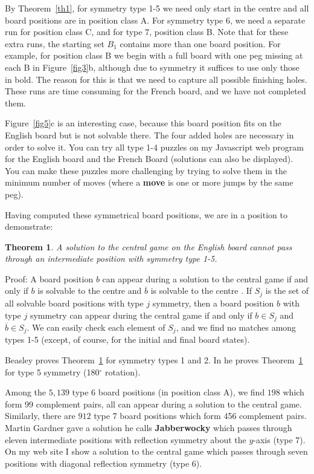 \documentclass[12pt,reqno]{article}
\newtheorem{theorem}{Theorem}
\begin{document}
By Theorem~\ref{th1}, for symmetry type 1-5 we need only start in the centre and all board positions are in position class A.
For symmetry type 6, we need a separate run for position class C, and for type 7, position class B.
Note that for these extra runs, the starting set $B_1$ contains more than one board position.
For example, for position class B we begin with a full board with one peg missing at each B in Figure~\ref{fig3}b,
although due to symmetry it suffices to use only those in bold.
The reason for this is that we need to capture all possible finishing holes.
These runs are time consuming for the French board, and we have not completed them.

Figure~\ref{fig5}c is an interesting case, because this board position
fits on the English board but is not solvable there.
The four added holes are necessary in order to solve it.
You can try all type 1-4 puzzles on my Javascript web program for the English board \cite{BellSymEng}
and the French Board \cite{BellSymFr} (solutions can also be displayed).
You can make these puzzles more challenging by trying to solve them in the minimum number of moves
(where a {\bf move} is one or more jumps by the same peg).

Having computed these symmetrical board positions, we are in a position to demonstrate:

\begin{theorem}
A solution to the central game on the English board cannot pass through an intermediate
position with symmetry type 1-5.
\label{th2}
\end{theorem}

Proof: A board position $b$ can appear during a solution to the central game if and only if
$b$ is solvable to the centre
and $\overline{b}$ is solvable to the centre \cite{GPJ04}.
If $S_j$ is the set of all solvable board positions with type $j$ symmetry,
then a board position $b$ with type $j$ symmetry
can appear during the central game if and only if $b\in S_j$ and $\overline{b}\in S_j$.
We can easily check each element of $S_j$, and we find no matches among types 1-5
(except, of course, for the initial and final board states).

Beasley \cite{Beasley} proves Theorem~\ref{th2} for symmetry types 1 and 2.
In \cite{Beasley180} he proves Theorem~\ref{th2} for type 5 symmetry (180$^{\circ}$ rotation).

Among the $5,139$ type 6 board positions (in position class A),
we find $198$ which form $99$ complement pairs, all can appear during a solution to the central game.
Similarly, there are $912$ type 7 board positions which form 456 complement pairs.
Martin Gardner gave a solution he calls {\bf Jabberwocky} \cite{Gardner} which passes through
eleven intermediate positions with reflection symmetry about the $y$-axis (type 7).
On my web site \cite{BellWeb} I show a solution to the central game which passes through seven
positions with diagonal reflection symmetry (type 6).
\end{document}
